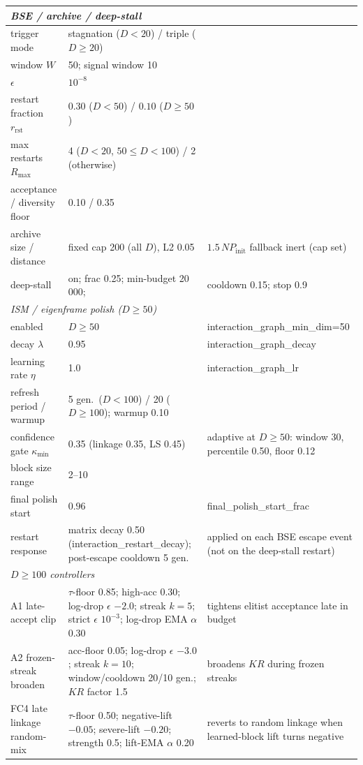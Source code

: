 \documentclass[10pt,a4paper]{article}
\begin{document}
\begin{table}[H]
\begin{tabular}{p{2.9cm} p{5.8cm} p{4.8cm}}
\midrule
\multicolumn{3}{l}{\emph{BSE / archive / deep-stall}}\\
\midrule
trigger mode & stagnation ($D{<}20$) / triple ($D\ge20$) & \\
window $W$ & 50; signal window 10 & \\
$\epsilon$ & $10^{-8}$ & \\
restart fraction $r_{\text{rst}}$ & $0.30$ ($D{<}50$) / $0.10$ ($D\ge50$) & \\
max restarts $R_{\max}$ & 4 ($D{<}20$, $50{\le}D{<}100$) / 2 (otherwise) & \\
acceptance / diversity floor & 0.10 / 0.35 & \\
archive size / distance & fixed cap 200 (all $D$), L2 0.05 & $1.5\,NP_{\text{init}}$ fallback inert (cap set)\\
deep-stall & on; frac 0.25; min-budget 20\,000; & cooldown 0.15; stop 0.9\\
\midrule
\multicolumn{3}{l}{\emph{ISM / eigenframe polish ($D\ge50$)}}\\
\midrule
enabled & $D\ge50$ & interaction\_graph\_min\_dim=50\\
decay $\lambda$ & 0.95 & interaction\_graph\_decay\\
learning rate $\eta$ & 1.0 & interaction\_graph\_lr\\
refresh period / warmup & 5 gen.\ ($D{<}100$) / 20 ($D\ge100$); warmup 0.10 & \\
confidence gate $\kappa_{\min}$ & 0.35 (linkage 0.35, LS 0.45) & adaptive at $D\ge50$: window 30, percentile 0.50, floor 0.12\\
block size range & 2--10 & \\
final polish start & $0.96$ & final\_polish\_start\_frac\\
restart response & matrix decay 0.50 (interaction\_restart\_decay); post-escape cooldown 5 gen.\ & applied on each BSE escape event (not on the deep-stall restart)\\
\midrule
\multicolumn{3}{l}{\emph{$D\ge100$ controllers}}\\
\midrule
A1 late-accept clip & $\tau$-floor 0.85; high-acc 0.30; log-drop $\epsilon$ $-2.0$; streak $k{=}5$; strict $\epsilon$ $10^{-3}$; log-drop EMA $\alpha$ 0.30 & tightens elitist acceptance late in budget\\
A2 frozen-streak broaden & acc-floor 0.05; log-drop $\epsilon$ $-3.0$; streak $k{=}10$; window/cooldown 20/10 gen.; $KR$ factor 1.5 & broadens $KR$ during frozen streaks\\
FC4 late linkage random-mix & $\tau$-floor 0.50; negative-lift $-0.05$; severe-lift $-0.20$; strength 0.5; lift-EMA $\alpha$ 0.20 & reverts to random linkage when learned-block lift turns negative\\

\end{tabular}
\end{table}
\end{document}
